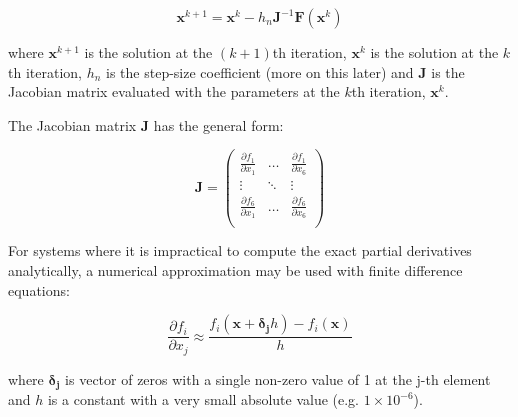 \documentclass{article}
\begin{document}
\begin{equation}
\label{eqn_NR}
\boldsymbol{x}^{k+1} = \boldsymbol{x}^{k} - h_{n} \mathbf{J}^{-1}  \mathbf{F}( \boldsymbol{x}^{k})
\end{equation}

where $\boldsymbol{x}^{k+1}$ is the solution at the $(k+1)$th iteration, $\boldsymbol{x}^{k}$ is the solution at the $k$th iteration, $h_{n}$ is the step-size coefficient (more on this later) and $\mathbf{J}$ is the Jacobian matrix evaluated with the parameters at the $k$th iteration, $\boldsymbol{x}^{k}$.

The Jacobian matrix $\mathbf{J}$ has the general form:

\begin{equation}
\label{eqn_Jac}
\mathbf{J} = \left( \begin{array}{ccc}
\frac{\partial f_{1}}{\partial x_{1}}  & \ldots & \frac{\partial f_{1}}{\partial x_{6}} \\
\vdots & \ddots & \vdots \\
\frac{\partial f_{6}}{\partial x_{1}}  & \ldots & \frac{\partial f_{6}}{\partial x_{6}} \\ \end{array} \right)
\end{equation}

For systems where it is impractical to compute the exact partial derivatives analytically, a numerical approximation may be used with finite difference equations:

\begin{equation}
\frac{\partial f_{i}}{\partial x_{j}} \approx \frac{f_{i} (\mathbf{x} + \boldsymbol{\delta_{j}} h) - f_{i} (\mathbf{x})}{h}
\end{equation}

where $\boldsymbol{\delta_{j}}$ is vector of zeros with a single non-zero value of 1 at the j-th element and $h$ is a constant with a very small absolute value (e.g. $1 \times 10^{-6}$).
\end{document}
